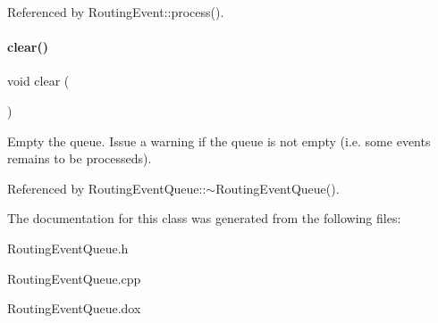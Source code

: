 Referenced by Routing\+Event\+::process().

\mbox{\label{classKite_1_1RoutingEventQueue_ac8bb3912a3ce86b15842e79d0b421204}} 
\paragraph{\texorpdfstring{clear()}{clear()}}
{\footnotesize\ttfamily void clear (\begin{DoxyParamCaption}{ }\end{DoxyParamCaption})}

Empty the queue. Issue a warning if the queue is not empty (i.\+e. some events remains to be processeds). 

Referenced by Routing\+Event\+Queue\+::$\sim$\+Routing\+Event\+Queue().



The documentation for this class was generated from the following files\+:\begin{DoxyCompactItemize}
\item 
Routing\+Event\+Queue.\+h\item 
Routing\+Event\+Queue.\+cpp\item 
Routing\+Event\+Queue.\+dox\end{DoxyCompactItemize}
